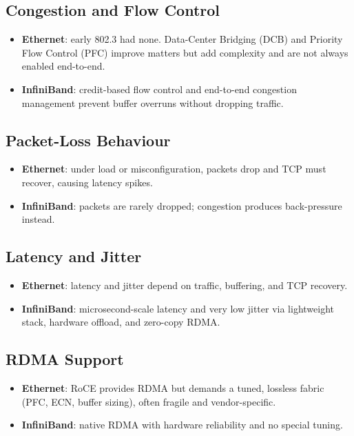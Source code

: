 \documentclass[../../../OAE-SPEC-MAIN.tex]{subfiles}
\begin{document}
\subsection{Congestion and Flow Control}
\begin{itemize}
  \item \textbf{Ethernet}: early 802.3 had none.  Data-Center Bridging
        (DCB) and Priority Flow Control (PFC) improve matters but add
        complexity and are not always enabled end-to-end.
  \item \textbf{InfiniBand}: credit-based flow control and end-to-end
        congestion management prevent buffer overruns without dropping
        traffic.
\end{itemize}

\subsection{Packet-Loss Behaviour}
\begin{itemize}
  \item \textbf{Ethernet}: under load or misconfiguration, packets drop
        and TCP must recover, causing latency spikes.
  \item \textbf{InfiniBand}: packets are rarely dropped; congestion
        produces back-pressure instead.
\end{itemize}

\subsection{Latency and Jitter}
\begin{itemize}
  \item \textbf{Ethernet}: latency and jitter depend on traffic,
        buffering, and TCP recovery.
  \item \textbf{InfiniBand}: microsecond-scale latency and very low
        jitter via lightweight stack, hardware offload, and zero-copy
        RDMA.
\end{itemize}

\subsection{RDMA Support}
\begin{itemize}
  \item \textbf{Ethernet}: RoCE provides RDMA but demands a tuned,
        lossless fabric (PFC, ECN, buffer sizing), often fragile and
        vendor-specific.
  \item \textbf{InfiniBand}: native RDMA with hardware reliability and
        no special tuning.
\end{itemize}
\end{document}

